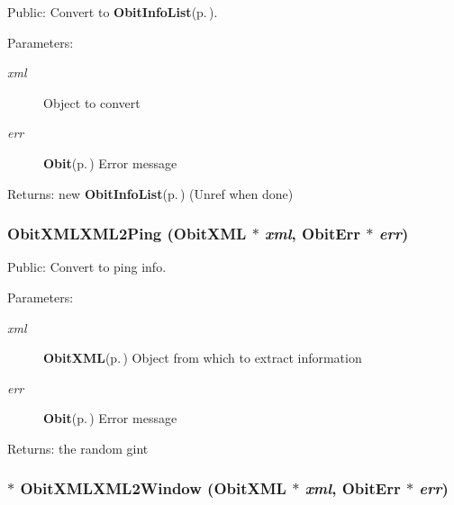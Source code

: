 Public: Convert to {\bf Obit\-Info\-List}{\rm (p.\,\pageref{structObitInfoList})}. 

\begin{Desc}
\item[Parameters:]
\begin{description}
\item[{\em xml}]Object to convert \item[{\em err}]{\bf Obit}{\rm (p.\,\pageref{structObit})} Error message \end{description}
\end{Desc}
\begin{Desc}
\item[Returns:]new {\bf Obit\-Info\-List}{\rm (p.\,\pageref{structObitInfoList})} (Unref when done) \end{Desc}
\subsubsection{ Obit\-XMLXML2Ping ({\bf Obit\-XML} $\ast$ {\em xml}, {\bf Obit\-Err} $\ast$ {\em err})}\label{ObitXML_8c_a15}


Public: Convert to ping info. 

\begin{Desc}
\item[Parameters:]
\begin{description}
\item[{\em xml}]{\bf Obit\-XML}{\rm (p.\,\pageref{structObitXML})} Object from which to extract information \item[{\em err}]{\bf Obit}{\rm (p.\,\pageref{structObit})} Error message \end{description}
\end{Desc}
\begin{Desc}
\item[Returns:]the random gint \end{Desc}
\subsubsection{$\ast$ Obit\-XMLXML2Window ({\bf Obit\-XML} $\ast$ {\em xml}, {\bf Obit\-Err} $\ast$ {\em err})}\label{ObitXML_8c_a22}


